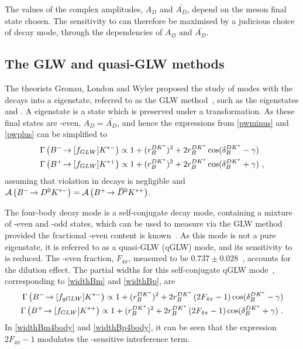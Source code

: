 The values of the complex amplitudes, $A_{D}$ and $\bar{A_{D}}$, depend on the \D meson final state chosen. The sensitivity to \Pgamma can therefore be maximised by a judicious choice of \Dz decay mode, through the dependencies of $A_{D}$ and $\bar{A_{D}}$.

\subsection{The GLW and quasi-GLW methods}
\label{sec:theory:glw}

The theorists Gronau, London and Wyler proposed the study of \decay{\Bm}{\D\Km} modes with the \D decays into a \CP eigenstate, referred to as the GLW method~\cite{GL,GW}, such as the eigenstates \decay{\Dz}{\Kp\Km} and \decay{\Dz}{\pip\pim}. A \CP eigenstate is a state which is preserved under a \CP transformation. As these final states are \CP-even, $A_{D} = \bar{A_{D}}$, and hence the expressions from \eqns\ref{pwminus} and \ref{pwplus} can be simplified to
\begin{align}
\Gamma\left({{{B}^-}}\!\rightarrow [f_{GLW}]{\ensuremath{{K}^{*-}}}\right) &\propto 1 + (r_B^{DK^*})^2 + 2r_B^{DK^*}\cos(\delta_B^{DK^*} - \gamma) \label{widthBm} \\
\Gamma\left({{{B}^+}}\!\rightarrow [f_{GLW}]{\ensuremath{{K}^{*+}}}\right) &\propto 1 + (r_B^{DK^*})^2 + 2r_B^{DK^*}\cos(\delta_B^{DK^*} + \gamma) \text { ,}\label{widthBp}
\end{align}
assuming that \CP violation in \D decays is negligible and $\mathcal{A}\left({{{B}^-}}\!\rightarrow {\ensuremath{{D}^0}}{\ensuremath{{K}^{*-}}}\right) = \mathcal{A}\left({{{B}^+}}\!\rightarrow {\ensuremath{{\kern 0.2em\overline{\kern -0.2em D}{}}{}^0}}{\ensuremath{{K}^{*+}}}\right)$. 

The four-body \D decay mode \decay{\D}{\pip\pim\pip\pim} is a self-conjugate decay mode, containing a mixture of \CP-even and \CP-odd states, which can be used to measure \Pgamma via the GLW method provided the fractional \CP-even content is known~\cite{NAYAK20151}. As this mode is not a pure \CP eigenstate, it is referred to as a quasi-GLW (qGLW) mode, and its sensitivity to \Pgamma is reduced. The \CP-even fraction, $F_{4\pi}$, measured to be $0.737 \pm 0.028$~\cite{charm4pi}, accounts for the dilution effect. The partial widths for this self-conjugate qGLW mode~\cite{NAYAK20151,charm4pi}, corresponding to \eqns\ref{widthBm} and \ref{widthBp}, are
\begin{align}
\Gamma\left({{{B}^-}}\!\rightarrow [f_{qGLW}]{\ensuremath{{K}^{*-}}}\right) \propto 1 + (r_B^{DK^*})^2 + 2r_B^{DK^*}\left(2F_{4\pi} - 1\right)\cos(\delta_B^{DK^*} - \gamma) \label{widthBm4body} \\
\Gamma\left({{{B}^+}}\!\rightarrow [f_{GLW}]{\ensuremath{{K}^{*+}}}\right) \propto 1 + (r_B^{DK^*})^2 + 2r_B^{DK^*}\left(2F_{4\pi} - 1\right)\cos(\delta_B^{DK^*} + \gamma) \text { .} \label{widthBp4body}
\end{align}
In \eqns\ref{widthBm4body} and \ref{widthBp4body}, it can be seen that the expression $2F_{4\pi} - 1$ modulates the \Pgamma-sensitive interference term.


